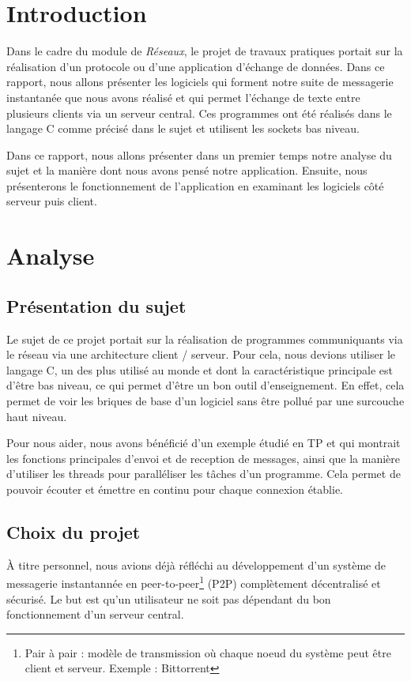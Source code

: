\chapter*{Introduction}
	Dans le cadre du module de \emph{Réseaux}, le projet de travaux pratiques portait sur la réalisation d'un protocole ou d'une application d'échange de données. Dans ce rapport, nous allons présenter les logiciels qui forment notre suite de messagerie instantanée que nous avons réalisé et qui permet l'échange de texte entre plusieurs clients via un serveur central. Ces programmes ont été réalisés dans le langage C comme précisé dans le sujet et utilisent les sockets bas niveau.
	
	Dans ce rapport, nous allons présenter dans un premier temps notre analyse du sujet et la manière dont nous avons pensé notre application. Ensuite, nous présenterons le fonctionnement de l'application en examinant les logiciels côté serveur puis client. 
		
\chapter{Analyse}
	\section{Présentation du sujet}
		Le sujet de ce projet portait sur la réalisation de programmes communiquants via le réseau via une architecture client / serveur.  Pour cela, nous devions utiliser le langage C, un des plus utilisé au monde et dont la caractéristique principale est d'être bas niveau, ce qui permet d'être un bon outil d'enseignement. En effet, cela permet de voir les briques de base d'un logiciel sans être pollué par une surcouche haut niveau.
		
		Pour nous aider, nous avons bénéficié d'un exemple étudié en TP et qui montrait les fonctions principales d'envoi et de reception de messages, ainsi que la manière d'utiliser les threads pour paralléliser les tâches d'un programme. Cela permet de pouvoir écouter et émettre en continu pour chaque connexion établie.

	\section{Choix du projet}
		À titre personnel, nous avions déjà réfléchi au développement d'un système de messagerie instantannée en peer-to-peer\footnote{Pair à pair : modèle de transmission où chaque noeud du système peut être client et serveur. Exemple : Bittorrent} (P2P) complètement décentralisé et sécurisé. Le but est qu'un utilisateur ne soit pas dépendant du bon fonctionnement d'un serveur central.\\
		
